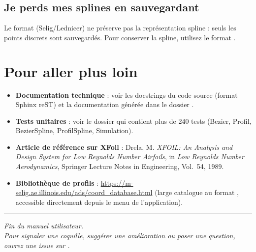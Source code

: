 \subsection*{Je perds mes splines en sauvegardant}

Le format  (Selig/Lednicer) ne préserve pas la
représentation spline : seuls les points discrets sont
sauvegardés. Pour conserver la spline, utilisez le format
.

\section{Pour aller plus loin}

\begin{itemize}
    \item \textbf{Documentation technique} : voir les docstrings
        du code source (format Sphinx reST) et la documentation
        générée dans le dossier .
    \item \textbf{Tests unitaires} : voir le dossier
         qui contient plus de 240 tests
        (Bezier, Profil, BezierSpline, ProfilSpline,
        Simulation).
    \item \textbf{Article de référence sur XFoil} :
        Drela, M. \emph{XFOIL: An Analysis and Design System for
        Low Reynolds Number Airfoils}, in \emph{Low Reynolds
        Number Aerodynamics}, Springer Lecture Notes in Engineering,
        Vol.~54, 1989.
    \item \textbf{Bibliothèque de profils} :
        \url{https://m-selig.ae.illinois.edu/ads/coord_database.html}
        (large catalogue au format , accessible
        directement depuis le menu  de l'application).

\end{itemize}

\bigskip
\hrule
\bigskip

\begin{center}
    \itshape
    Fin du manuel utilisateur.\\
    Pour signaler une coquille, suggérer une amélioration ou
    poser une question, ouvrez une \emph{issue} sur
    .
\end{center}
